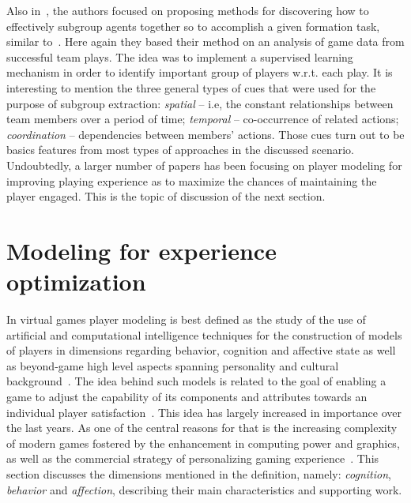 Also in~\cite{laviersa_using_2014}, the authors focused on proposing methods for discovering how to effectively  subgroup agents together so to accomplish a given formation task, similar to~\cite{stone_task_1999}. Here again they based their method on an analysis of game data from successful team plays. The idea was to implement a supervised learning mechanism in order to identify important group of players w.r.t. each play. It is interesting to mention the three general types of cues that were used for the purpose of subgroup extraction: \textit{spatial} -- i.e, the constant relationships between team members over a period of time; \textit{temporal} -- co-occurrence of related actions; \textit{coordination} -- dependencies between members' actions. Those cues turn out to be basics features from most types of approaches in the discussed scenario. Undoubtedly, a larger number of papers has been focusing on player modeling for improving playing experience as to maximize the chances of maintaining the player engaged. This is the topic of discussion of the next section.


\section{Modeling for experience optimization}\label{expOptimization}
In virtual games player modeling is best defined as the study of the use of artificial and computational intelligence techniques for the construction of models of players in dimensions regarding behavior, cognition and affective state as well as beyond-game high level aspects spanning personality and cultural background~\cite{yannakakis_player_2013}. The idea behind such models is related to the goal of enabling a game to adjust the capability of its components and attributes towards an individual player satisfaction~\cite{herik_opponent_2005}. This idea has largely increased in importance over the last years. As one of the central reasons for that is the increasing complexity of modern games fostered by the enhancement in computing power and graphics, as well as the commercial strategy of personalizing gaming experience~\cite{teng_customization_2010, herik_opponent_2005}. This section discusses the dimensions mentioned in the definition, namely: \textit{cognition}, \textit{behavior} and \textit{affection}, describing their main characteristics and supporting work.

